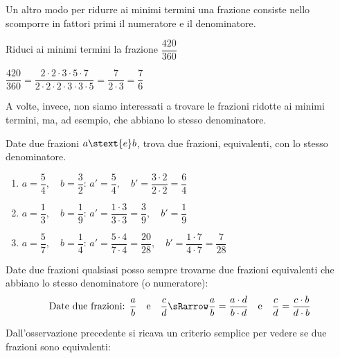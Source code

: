 Un altro modo per ridurre ai minimi termini una frazione consiste nello 
scomporre in fattori primi il numeratore e il denominatore.

\begin{esempio}{}{}
Riduci ai minimi termini la frazione \(\dfrac{420}{360}\)

\(\dfrac{420}{360} = 
  \dfrac{2 \cdot 2 \cdot 3 \cdot 5 \cdot 7}
        {2 \cdot 2 \cdot 2 \cdot 3 \cdot 3 \cdot 5} = 
  \dfrac{7}{2 \cdot 3} = \dfrac{7}{6}\)
\end{esempio}

A volte, invece, non siamo interessati a trovare le frazioni ridotte ai 
minimi termini, ma, ad esempio,  che 
abbiano lo stesso denominatore.

\begin{esempi}{}{}
Date due frazioni \(a \stext{e} b\), trova due frazioni, equivalenti, con lo 
stesso denominatore.

\begin{enumerate} [nosep]
\spazielenx
\item \(a = \dfrac{5}{4}, \quad b = \dfrac{3}{2}\): \qquad 
\(a'=\dfrac{5}{4}, \quad b'=\dfrac{3 \cdot 2}{2 \cdot 2}=\dfrac{6}{4}\)
\item \(a = \dfrac{1}{3}, \quad b = \dfrac{1}{9}\): \qquad 
\(a'=\dfrac{1 \cdot 3}{3 \cdot 3}=\dfrac{3}{9}, \quad b'=\dfrac{1}{9}\)
\item \(a = \dfrac{5}{7}, \quad b = \dfrac{1}{4}\): \qquad 
\(a'=\dfrac{5 \cdot 4}{7 \cdot 4}=\dfrac{20}{28}, \quad 
  b'=\dfrac{1 \cdot 7}{4 \cdot 7}=\dfrac{7}{28}\)
\end{enumerate}
\end{esempi}

\begin{osservazione}{}{}
Date due frazioni qualsiasi posso sempre trovarne due frazioni equivalenti 
che abbiano lo stesso denominatore (o numeratore):
\[\text{Date due frazioni: } \frac{a}{b} \quad \text{e} \quad \frac{c}{d} 
\sRarrow
\frac{a}{b} = \frac{a \cdot d}{b \cdot d} \quad \text{e} \quad 
\frac{c}{d} = \frac{c \cdot b}{d \cdot b}\]
\end{osservazione}

Dall'osservazione precedente si ricava un criterio semplice 
per vedere se due frazioni sono equivalenti:

